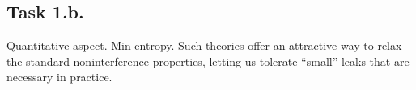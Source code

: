 \subsection{Task 1.b.} Quantitative aspect.
Min entropy.
Such theories offer an attractive way to relax the standard noninterference properties, letting us tolerate “small” leaks that are necessary in practice. 
